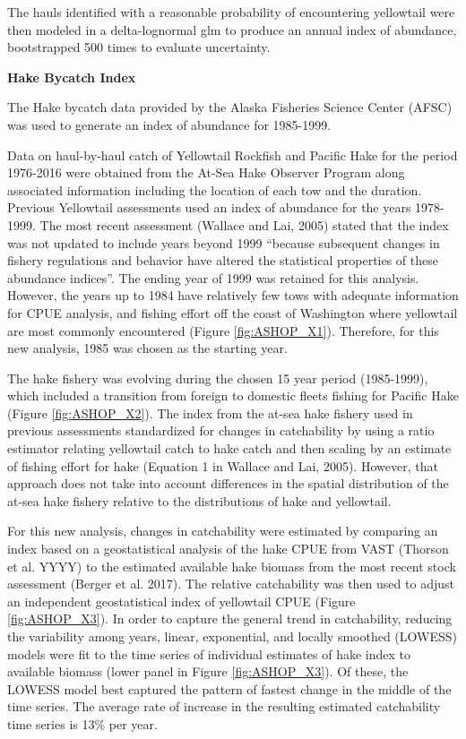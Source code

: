 \documentclass[12pt,]{article}
\begin{document}
The hauls identified with a reasonable probability of encountering
yellowtail were then modeled in a delta-lognormal glm to produce an
annual index of abundance, bootstrapped 500 times to evaluate
uncertainty.

\textbf{Hake Bycatch Index}

The Hake bycatch data provided by the Alaska Fisheries Science Center
(AFSC) was used to generate an index of abundance for 1985-1999.

Data on haul-by-haul catch of Yellowtail Rockfish and Pacific Hake for
the period 1976-2016 were obtained from the At-Sea Hake Observer Program
along associated information including the location of each tow and the
duration. Previous Yellowtail assessments used an index of abundance for
the years 1978-1999. The most recent assessment (Wallace and Lai, 2005)
stated that the index was not updated to include years beyond 1999
``because subsequent changes in fishery regulations and behavior have
altered the statistical properties of these abundance indices''. The
ending year of 1999 was retained for this analysis. However, the years
up to 1984 have relatively few tows with adequate information for CPUE
analysis, and fishing effort off the coast of Washington where
yellowtail are most commonly encountered (Figure \ref{fig:ASHOP_X1}).
Therefore, for this new analysis, 1985 was chosen as the starting year.

The hake fishery was evolving during the chosen 15 year period
(1985-1999), which included a transition from foreign to domestic fleets
fishing for Pacific Hake (Figure \ref{fig:ASHOP_X2}). The index from the
at-sea hake fishery used in previous assessments standardized for
changes in catchability by using a ratio estimator relating yellowtail
catch to hake catch and then scaling by an estimate of fishing effort
for hake (Equation 1 in Wallace and Lai, 2005). However, that approach
does not take into account differences in the spatial distribution of
the at-sea hake fishery relative to the distributions of hake and
yellowtail.

For this new analysis, changes in catchability were estimated by
comparing an index based on a geostatistical analysis of the hake CPUE
from VAST (Thorson et al. YYYY) to the estimated available hake biomass
from the most recent stock assessment (Berger et al. 2017). The relative
catchability was then used to adjust an independent geostatistical index
of yellowtail CPUE (Figure \ref{fig:ASHOP_X3}). In order to capture the
general trend in catchability, reducing the variability among years,
linear, exponential, and locally smoothed (LOWESS) models were fit to
the time series of individual estimates of hake index to available
biomass (lower panel in Figure \ref{fig:ASHOP_X3}). Of these, the LOWESS
model best captured the pattern of fastest change in the middle of the
time series. The average rate of increase in the resulting estimated
catchability time series is 13\% per year.
\end{document}
